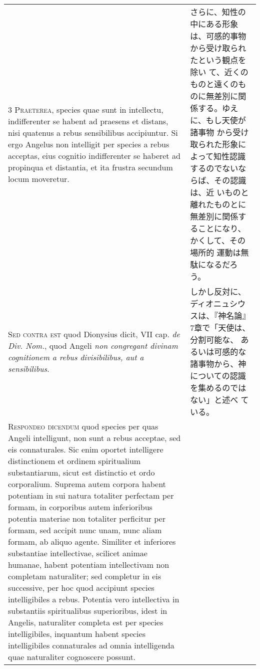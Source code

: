 \documentclass[10pt]{jsarticle} %
\begin{document}
\begin{longtable}{p{21em}p{21em}}
{\scshape 3 Praeterea}, species quae sunt in intellectu, indifferenter
se habent ad praesens et distans, nisi quatenus a rebus sensibilibus
accipiuntur. Si ergo Angelus non intelligit per species a rebus
acceptas, eius cognitio indifferenter se haberet ad propinqua et
distantia, et ita frustra secundum locum moveretur.

&

さらに、知性の中にある形象は、可感的事物から受け取られたという観点を除い
 て、近くのものと遠くのものに無差別に関係する。ゆえに、もし天使が諸事物
 から受け取られた形象によって知性認識するのでないならば、その認識は、近
 いものと離れたものとに無差別に関係することになり、かくして、その場所的
 運動は無駄になるだろう。
 

\\


{\scshape  Sed contra est} quod Dionysius dicit, VII cap. {\itshape de Div. Nom.},
quod Angeli {\itshape non congregant divinam cognitionem a rebus divisibilibus,
aut a sensibilibus}.

&

 しかし反対に、ディオニュシウスは、『神名論』7章で「天使は、分割可能な、
 あるいは可感的な諸事物から、神についての認識を集めるのではない」と述べ
 ている。
 

\\


{\scshape Respondeo dicendum} quod species per quas Angeli intelligunt,
non sunt a rebus acceptae, sed eis connaturales. Sic enim oportet
intelligere distinctionem et ordinem spiritualium substantiarum, sicut
est distinctio et ordo corporalium. Suprema autem corpora habent
potentiam in sui natura totaliter perfectam per formam, in corporibus
autem inferioribus potentia materiae non totaliter perficitur per
formam, sed accipit nunc unam, nunc aliam formam, ab aliquo
agente. Similiter et inferiores substantiae intellectivae, scilicet
animae humanae, habent potentiam intellectivam non completam
naturaliter; sed completur in eis successive, per hoc quod accipiunt
species intelligibiles a rebus. Potentia vero intellectiva in
substantiis spiritualibus superioribus, idest in Angelis, naturaliter
completa est per species intelligibiles, inquantum habent species
intelligibiles connaturales ad omnia intelligenda quae naturaliter
cognoscere possunt. 


&


\end{longtable}
\end{document}
